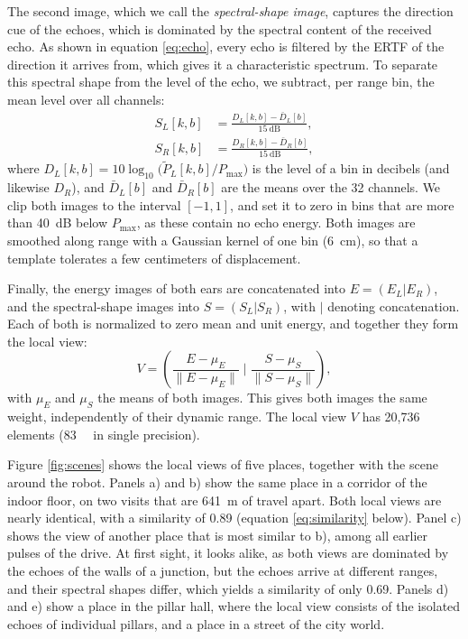 \documentclass[journal]{IEEEtran}
\begin{document}
The second image, which we call the \emph{spectral-shape image}, captures the direction cue of the echoes, which is dominated by the spectral content of the received echo. As shown in equation \ref{eq:echo}, every echo is filtered by the ERTF of the direction it arrives from, which gives it a characteristic spectrum. To separate this spectral shape from the level of the echo, we subtract, per range bin, the mean level over all channels:
\begin{equation}
\begin{aligned}
S_L[k,b] &= \frac{D_L[k,b] - \bar{D}_L[b]}{\SI{15}{\deci\bel}}, \\
S_R[k,b] &= \frac{D_R[k,b] - \bar{D}_R[b]}{\SI{15}{\deci\bel}},
\end{aligned}
\label{eq:shape}
\end{equation}
%
where $D_L[k,b] = 10 \log_{10} \big( \tilde{P}_L[k,b] / P_{\max} \big)$ is the level of a bin in decibels (and likewise $D_R$), and $\bar{D}_L[b]$ and $\bar{D}_R[b]$ are the means over the 32 channels. We clip both images to the interval $[-1, 1]$, and set it to zero in bins that are more than \SI{40}{\deci\bel} below $P_{\max}$, as these contain no echo energy. Both images are smoothed along range with a Gaussian kernel of one bin (\SI{6}{\centi\meter}), so that a template tolerates a few centimeters of displacement.

Finally, the energy images of both ears are concatenated into $E = (E_L | E_R)$, and the spectral-shape images into $S = (S_L | S_R)$, with $|$ denoting concatenation. Each of both is normalized to zero mean and unit energy, and together they form the local view:
\begin{equation}
V = \left( \frac{E - \mu_E}{\| E - \mu_E \|} \; \bigg| \; \frac{S - \mu_S}{\| S - \mu_S \|} \right),
\end{equation}
%
with $\mu_E$ and $\mu_S$ the means of both images. This gives both images the same weight, independently of their dynamic range. The local view $V$ has 20,736 elements (\SI{83}{\kilo\byte} in single precision).

Figure \ref{fig:scenes} shows the local views of five places, together with the scene around the robot. Panels a) and b) show the same place in a corridor of the indoor floor, on two visits that are \SI{641}{\meter} of travel apart. Both local views are nearly identical, with a similarity of 0.89 (equation \ref{eq:similarity} below). Panel c) shows the view of another place that is most similar to b), among all earlier pulses of the drive. At first sight, it looks alike, as both views are dominated by the echoes of the walls of a junction, but the echoes arrive at different ranges, and their spectral shapes differ, which yields a similarity of only 0.69. Panels d) and e) show a place in the pillar hall, where the local view consists of the isolated echoes of individual pillars, and a place in a street of the city world.
\end{document}
